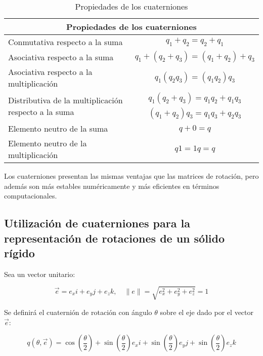 \documentclass[10pt, a4paper]{report}
\begin{document}
\begin{table}[h]
\center
\begin{tabular}{|l|c|}

\hline
\multicolumn{2}{|c|}{\textbf{Propiedades de los cuaterniones}}\\
\hline
Conmutativa respecto a la suma & $ q_1 + q_2 = q_2 + q_1 $ \\
\hline
Asociativa respecto a la suma & $ q_1 + (q_2 + q_3) = (q_1 + q_2) + q_3 $ \\
\hline
Asociativa respecto a la multiplicación & $ q_1(q_2q_3) = (q_1q_2)q_3 $ \\
\hline
\multirow{2}{*}{Distributiva de la multiplicación respecto a la suma} & $ q_1(q_2 + q_3) = q_1q_2 + q_1q_3 $ \\
\cline{2-2}
 & $ (q_1 + q_2)q_3 = q_1q_3 + q_2q_3 $ \\
\hline
Elemento neutro de la suma & $ q + 0 = q $ \\
\hline
Elemento neutro de la multiplicación & $ q1 = 1q = q $ \\
\hline

\end{tabular}

\caption{Propiedades de los cuaterniones}
\label{tab:propiedades_cuaterniones}

\end{table}

Los cuaterniones presentan las mismas ventajas que las matrices de rotación, pero además son más estables numéricamente y más eficientes en términos computacionales.

\subsection{Utilización de cuaterniones para la representación de rotaciones de un sólido rígido}

Sea un vector unitario:

\begin{equation}
\vec{e} = e_x i + e_y j + e_z k, \quad \|e\| = \sqrt{e_x^2 + e_y^2 + e_z^2} = 1
\end{equation}


Se definirá el cuaternión de rotación con ángulo $\theta$ sobre el eje dado por el vector $\vec{e}$:

\begin{equation}
q(\theta, \vec{e}) = \cos \left(\frac{\theta}{2}\right) + \sin \left(\frac{\theta}{2}\right) e_x i + \sin \left(\frac{\theta}{2}\right) e_y j + \sin \left(\frac{\theta}{2}\right) e_z k 
\end{equation}
\end{document}
